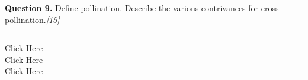 \documentclass[11pt,a4paper]{article}
\newcommand{\pts}[1]{\hfill   \textit{[#1]}}
\begin{document}
\medskip


\noindent   \textbf{Question 9.} Define pollination. Describe the various contrivances for cross-pollination.\pts{15}

\vfill
\rule{\linewidth}{0.4pt}

\begin{center}\small
\href{https://bhu-exam.vercel.app/}{Click Here}\\[4pt]\href{https://me-aryan.vercel.app/}{Click Here}\\[4pt]\href{https://quashan-me.vercel.app/}{Click Here}
\end{center}
\end{document}
